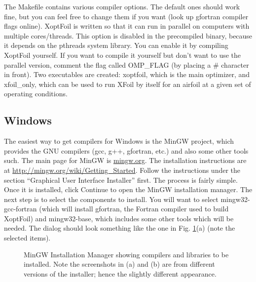\documentclass[11pt]{article}
\begin{document}
The Makefile contains various compiler options.  The default ones should work fine, but
you can feel free to change them if you want (look up gfortran compiler flags online).
XoptFoil is written so that it can run in parallel on computers with multiple
cores/threads.  This option is disabled in the precompiled binary, because it depends on
the pthreads system library.  You can enable it by compiling XoptFoil yourself.  If you
want to compile it yourself but don't want to use the parallel version, comment the flag
called OMP\_FLAG (by placing a \# character in front). Two executables are
created: xoptfoil, which is the main optimizer, and xfoil\_only, which can be used to run 
XFoil by itself for an airfoil at a given set of operating conditions.

\subsection{Windows}\label{sec:compile_windows}

The easiest way to get compilers for Windows is the MinGW project, which provides the GNU
compilers (gcc, g++, gfortran, etc.) and also some other tools such.  The main page for
MinGW is \url{mingw.org}.  The installation instructions are at
\url{http://mingw.org/wiki/Getting_Started}.  Follow the instructions under the section
``Graphical User Interface Installer'' first.  The process is fairly simple.  Once it is
installed, click Continue to open the MinGW installation manager.  The next step is to
select the components to install.  You will want to select mingw32-gcc-fortran 
(which will install gfortran, the Fortran
compiler used to build XoptFoil) and mingw32-base, which includes some other tools
which will be needed.  The dialog should look something like the one in Fig.
\ref{fig:installmingw1}(a) (note the selected items).

\begin{figure}[!h]
\centering

   \caption{MinGW Installation Manager showing compilers and libraries to be installed.
Note the screenshots in (a) and (b) are from different versions of the installer; hence
the slightly different appearance.}
\label{fig:installmingw1}
\end{figure}
\end{document}

